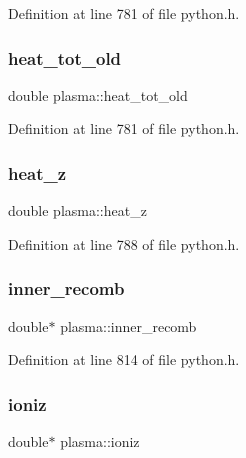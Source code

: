 Definition at line 781 of file python.\+h.

\mbox{\label{structplasma_a1cb334619d10653be16138483cf13a8a}} 
\subsubsection{\texorpdfstring{heat\+\_\+tot\+\_\+old}{heat\_tot\_old}}
{\footnotesize\ttfamily double plasma\+::heat\+\_\+tot\+\_\+old}



Definition at line 781 of file python.\+h.

\mbox{\label{structplasma_a5748c6ee35ca4d9458a8bf20d1930b55}} 
\subsubsection{\texorpdfstring{heat\+\_\+z}{heat\_z}}
{\footnotesize\ttfamily double plasma\+::heat\+\_\+z}



Definition at line 788 of file python.\+h.

\mbox{\label{structplasma_ae60f001b2bf22f33edb3e818e55f6807}} 
\subsubsection{\texorpdfstring{inner\+\_\+recomb}{inner\_recomb}}
{\footnotesize\ttfamily double$\ast$ plasma\+::inner\+\_\+recomb}



Definition at line 814 of file python.\+h.

\mbox{\label{structplasma_ad5797671f1fe6d9e2a638df668ea51df}} 
\subsubsection{\texorpdfstring{ioniz}{ioniz}}
{\footnotesize\ttfamily double$\ast$ plasma\+::ioniz}



